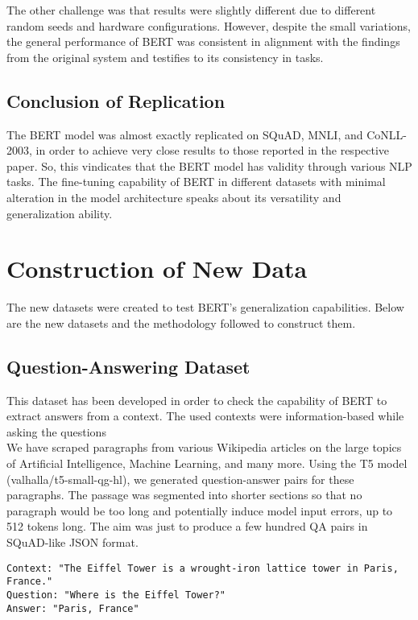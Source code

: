 \documentclass{article}
\begin{document}
The other challenge was that results were slightly different due to different random seeds and hardware configurations. However, despite the small variations, the general performance of BERT was consistent in alignment with the findings from the original system and testifies to its consistency in tasks.

\subsection{Conclusion of Replication}
The BERT model was almost exactly replicated on SQuAD, MNLI, and CoNLL-2003, in order to achieve very close results to those reported in the respective paper. So, this vindicates that the BERT model has validity through various NLP tasks. The fine-tuning capability of BERT in different datasets with minimal alteration in the model architecture speaks about its versatility and generalization ability.


\section{Construction of New Data}
The new datasets were created to test BERT’s generalization capabilities. Below are the new datasets and the methodology followed to construct them.

\subsection{Question-Answering Dataset}
This dataset has been developed in order to check the capability of BERT to extract answers from a context. The used contexts were information-based while asking the questions\\
We have scraped paragraphs from various Wikipedia articles on the large topics of Artificial Intelligence, Machine Learning, and many more.
Using the T5 model (valhalla/t5-small-qg-hl), we generated question-answer pairs for these paragraphs.
The passage was segmented into shorter sections so that no paragraph would be too long and potentially induce model input errors, up to 512 tokens long.
The aim was just to produce a few hundred QA pairs in SQuAD-like JSON format.
\begin{verbatim}
Context: "The Eiffel Tower is a wrought-iron lattice tower in Paris, France."
Question: "Where is the Eiffel Tower?"
Answer: "Paris, France"
\end{verbatim}
\end{document}
